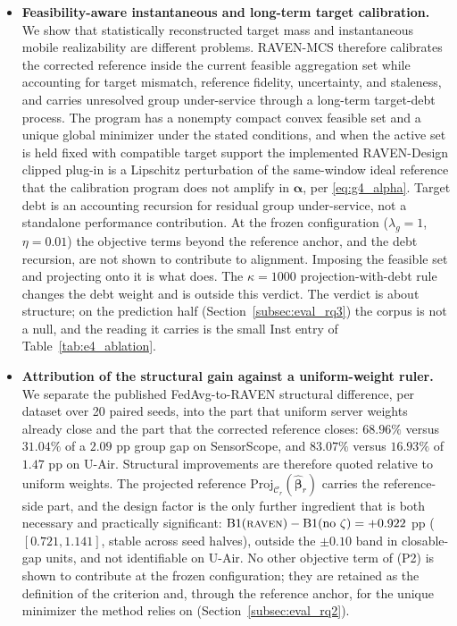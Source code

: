 \documentclass[letterpaper,journal]{IEEEtran}
\begin{document}
\begin{itemize}
    \item \textbf{Feasibility-aware instantaneous and long-term target
    calibration.}
    We show that statistically reconstructed target mass and instantaneous
    mobile realizability are different problems.  RAVEN-MCS therefore calibrates
    the corrected reference inside the current feasible aggregation set while
    accounting for target mismatch, reference fidelity, uncertainty, and
    staleness, and carries unresolved group under-service through a long-term
    target-debt process.  The program has a nonempty compact convex
    feasible set and a unique global minimizer under the stated conditions, and
    when the active set is held fixed with compatible target support the
    implemented RAVEN-Design clipped plug-in is a Lipschitz perturbation of the
    same-window ideal reference that the calibration program does not amplify in
    $\boldsymbol\alpha$, per \eqref{eq:g4_alpha}.
    Target debt is an accounting recursion for residual group under-service, not
    a standalone performance contribution.  At the frozen
    configuration ($\lambda_g=1$, $\eta=0.01$) the objective terms beyond the
    reference anchor, and the debt recursion, are not
    shown to contribute to alignment.  Imposing the feasible set and projecting
    onto it is what does.  The $\kappa=1000$
    projection-with-debt rule changes the debt weight and is outside this
    verdict.  The verdict is about structure; on the prediction half
    (Section~\ref{subsec:eval_rq3}) the corpus is not a null, and the reading it
    carries is the small Inst entry of Table~\ref{tab:e4_ablation}.

    \item \textbf{Attribution of the structural gain against a uniform-weight
    ruler.}
    We separate the published FedAvg-to-RAVEN structural difference, per dataset
    over 20 paired seeds, into the part that uniform server weights already close
    and the part that the corrected reference closes: $68.96\%$ versus $31.04\%$
    of a $2.09$ pp group gap on SensorScope, and $83.07\%$ versus $16.93\%$ of
    $1.47$ pp on U-Air.  Structural improvements are therefore quoted relative to
    uniform weights.  The projected reference
    $\mathrm{Proj}_{\mathcal{C}_r}(\widehat{\boldsymbol\beta}_r)$ carries the
    reference-side part, and the design factor is the only further ingredient
    that is both necessary and practically significant:
    $\mathrm{B1}(\textsc{raven})-\mathrm{B1}(\text{no }\zeta)=+0.922$ pp
    ($[0.721,1.141]$, stable across seed halves), outside the $\pm0.10$ band in
    closable-gap units, and not identifiable on U-Air.  No other objective term
    of (P2) is shown to contribute at the frozen configuration; they are retained
    as the definition of the criterion and, through the reference anchor, for the
    unique minimizer the method relies on (Section~\ref{subsec:eval_rq2}).
\end{itemize}
\end{document}
